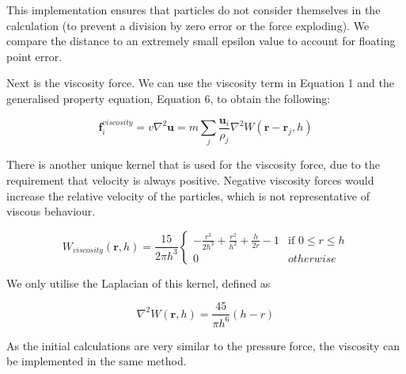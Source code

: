 \documentclass[a4paper, 12pt]{article}
\begin{document}
    This implementation ensures that particles do not consider themselves in the calculation (to prevent a division by zero error or the force exploding). We compare the distance to an extremely small epsilon value to account for floating point error.
    
    Next is the viscosity force. We can use the viscosity term in Equation 1 and the generalised property equation, Equation 6, to obtain the following:

    \begin{equation}
        \textbf{f}^{viscosity}_{i} = v\nabla^2\textbf{u} = m\sum_{j}{\frac{\textbf{u}_i}{\rho_j}\nabla^2{W(\textbf{r} - \textbf{r}_j, h)}}
    \end{equation}

    There is another unique kernel that is used for the viscosity force, due to the requirement that velocity is always positive. Negative viscosity forces would increase the relative velocity of the particles, which is not representative of viscous behaviour.

    \begin{equation}
        W_{viscosity}(\textbf{r}, h) = \frac{15}{2\pi{h}^3}
        \begin{cases}
            -\frac{r^3}{2h^3}+\frac{r^2}{h^2}+\frac{h}{2r} - 1 & \text{if } 0 \leq r \leq h \\
            0 & otherwise
        \end{cases}
    \end{equation}

    We only utilise the Laplacian of this kernel, defined as

    \begin{equation}
        \nabla^2W(\textbf{r}, h) = \frac{45}{\pi{h}^6}(h - r)
    \end{equation}

    As the initial calculations are very similar to the pressure force, the viscosity can be implemented in the same method.
\end{document}
